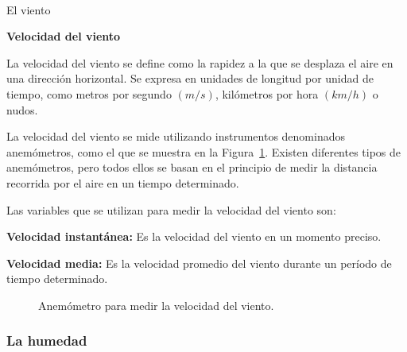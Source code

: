 \documentclass[
  us-letterpaper,
]{scrreprt}
\makeatletter
\let\oldparagraph\paragraph
\renewcommand{\paragraph}{
    \@ifstar
      \xxxParagraphStar
      \xxxParagraphNoStar
  }
\newcommand{\xxxParagraphStar}[1]{\oldparagraph*{#1}\mbox{}}
\newcommand{\xxxParagraphNoStar}[1]{\oldparagraph{#1}\mbox{}}
\theoremstyle{plain}
\theoremstyle{definition}
\theoremstyle{definition}
\theoremstyle{remark}
\makeatother
\begin{document}
\paragraph{El viento}\label{el-viento}

\textbf{Velocidad del viento}

La velocidad del viento se define como la rapidez a la que se desplaza
el aire en una dirección horizontal. Se expresa en unidades de longitud
por unidad de tiempo, como metros por segundo \((m/s)\), kilómetros por
hora \((km/h)\) o nudos.

La velocidad del viento se mide utilizando instrumentos denominados
anemómetros, como el que se muestra en la Figura~\ref{fig-anemometro}.
Existen diferentes tipos de anemómetros, pero todos ellos se basan en el
principio de medir la distancia recorrida por el aire en un tiempo
determinado.

Las variables que se utilizan para medir la velocidad del viento son:

\textbf{Velocidad instantánea:} Es la velocidad del viento en un momento
preciso.

\textbf{Velocidad media:} Es la velocidad promedio del viento durante un
período de tiempo determinado.

\begin{figure}


\caption{\label{fig-anemometro}Anemómetro para medir la velocidad del
viento.}

\end{figure}%

\subsubsection{La humedad}\label{la-humedad}
\end{document}
